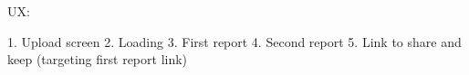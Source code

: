 UX:

1. Upload screen
2. Loading
3. First report
4. Second report
5. Link to share and keep (targeting first report link)